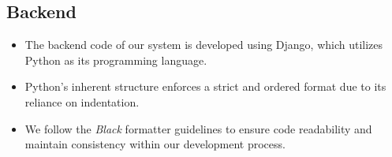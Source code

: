 \documentclass[12pt]{article}
\begin{document}
\subsection{Backend}
\begin{itemize}
    \item The backend code of our system is developed using Django, which utilizes Python as its programming language.
    \item Python's inherent structure enforces a strict and ordered format due to its reliance on indentation.
    \item We follow the \textit{Black} formatter guidelines to ensure code readability and maintain consistency within our development process.
\end{itemize}
\end{document}
